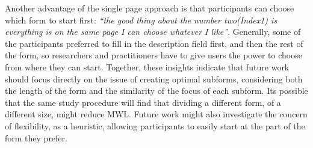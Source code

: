 \documentclass[../main/Replicate.tex]{subfiles}
\begin{document}

	Another advantage of the single page approach is that participants can choose which form to start first: \textit{``the good thing about the number two(Index1) is everything is on the same page I can choose whatever I like''}. 
	Generally, some of the participants preferred to fill in the description field first, and then the rest of the form, so researchers and practitioners have to give users the power to choose from where they can start. Together, these insights indicate that future work should focus directly on the issue of creating optimal subforms, considering both the length of the form and the similarity of the focus of each subform. Its possible that the same study procedure will find that dividing a different form, of a different size, might reduce MWL. Future work might also investigate the concern of flexibility, as a heuristic, allowing participants to easily start at the part of the form they prefer.

	
\end{document}
